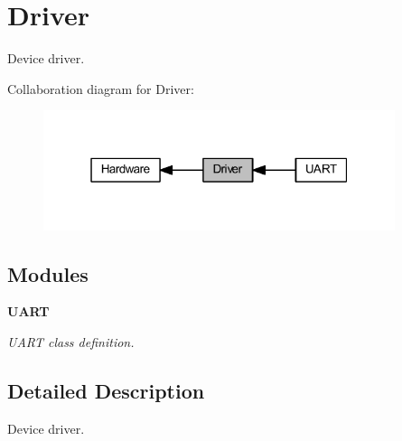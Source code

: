 \section{Driver}
\label{group___driver}


Device driver.  


Collaboration diagram for Driver\+:
\nopagebreak
\begin{figure}[H]
\begin{center}
\leavevmode
\includegraphics[width=292pt]{group___driver}
\end{center}
\end{figure}
\subsection*{Modules}
\begin{DoxyCompactItemize}
\item 
\textbf{ U\+A\+RT}
\begin{DoxyCompactList}\small\item\em U\+A\+RT class definition. \end{DoxyCompactList}\end{DoxyCompactItemize}


\subsection{Detailed Description}
Device driver. 

